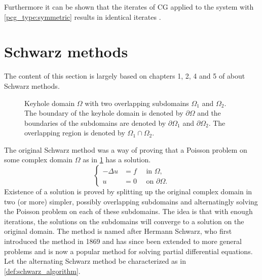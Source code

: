 Furthermore it can be shown that the iterates of CG applied to the system with \ref{pcg_type:symmetric} results in identical iterates \cite[Algorithm 9.2]{iter_method_saad}.

\section{Schwarz methods}\label{sec:schwarz_methods}
The content of this section is largely based on chapters 1, 2, 4 and 5 of \cite{schwarz_methods_Dolean_2015} about Schwarz methods.
\begin{figure}[H]
  \centering
  
  \caption{Keyhole domain $\Omega$ with two overlapping subdomains $\Omega_1$ and $\Omega_2$. The boundary of the keyhole domain is denoted by $\partial\Omega$ and the boundaries of the subdomains are denoted by $\partial\Omega_1$ and $\partial\Omega_2$. The overlapping region is denoted by $\Omega_1 \cap \Omega_2$.}
  \label{fig:keyhole_domain}
\end{figure}
The original Schwarz method was a way of proving that a Poisson problem on some complex domain $\Omega$ as in \cref{fig:keyhole_domain} has a solution.
\begin{equation}
  \begin{cases}
    -\Delta u & = f \quad \text{ in } \Omega,          \\
    u         & = 0 \quad \text{ on } \partial \Omega.
  \end{cases}
  \label{eq:poisson_problem}
\end{equation}
Existence of a solution is proved by splitting up the original complex domain in two (or more) simpler, possibly overlapping subdomains and alternatingly solving the Poisson problem on each of these subdomains. The idea is that with enough iterations, the solutions on the subdomains will converge to a solution on the original domain. The method is named after Hermann Schwarz, who first introduced the method in 1869 \cite{og_schwarz_method_Schwarz} and has since been extended to more general problems and is now a popular method for solving partial differential equations. Let the alternating Schwarz method be characterized as in \cref{def:schwarz_algorithm}.
